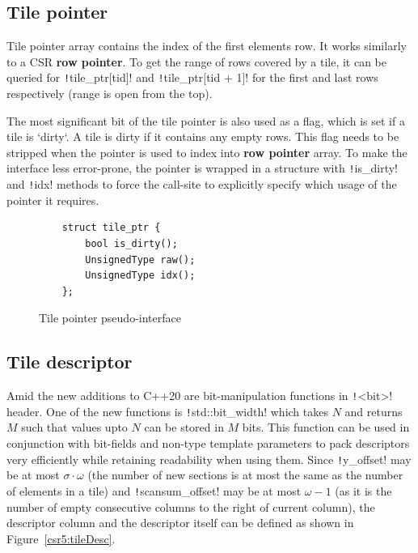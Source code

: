 \documentclass[thesis=M,english]{FITthesis}[2019/12/23]
\newcommand{\csre}[1]{\texttt!#1!}
\begin{document}
\subsection{Tile pointer}

Tile pointer array contains the index of the first elements row. It works similarly to a CSR
\textbf{row pointer}. To get the range of rows covered by a tile, it can be queried for \csre{tile_ptr[tid]}
and \csre{tile_ptr[tid + 1]} for the first and last rows respectively (range is open from the top).

The most significant bit of the tile pointer is also used as a flag, which is set if a tile is `dirty`.
A tile is dirty if it contains any empty rows. This flag needs to be stripped when the pointer is used to
index into \textbf{row pointer} array. To make the interface less error-prone, the pointer is wrapped
in a structure with \csre{is_dirty} and \csre{idx} methods to force the call-site to explicitly specify
which usage of the pointer it requires.

\begin{figure}[htp]
    \begin{verbatim}
    struct tile_ptr {
        bool is_dirty();
        UnsignedType raw(); 
        UnsignedType idx(); 
    };
    \end{verbatim}
    \caption{Tile pointer pseudo-interface}
\end{figure}



\subsection{Tile descriptor}

Amid the new additions to C++20 are bit-manipulation functions in \csre{<bit>} header.
One of the new functions is \csre{std::bit_width} which takes \(N\) and returns \(M\) such that values
upto \(N\) can be stored in \(M\) bits. This function can be used in conjunction with bit-fields
and non-type template parameters to pack descriptors very efficiently while retaining readability when using
them. Since \csre{y_offset} may be at most \(\sigma \cdot \omega\) (the number of new sections is at most the same
as the number of elements in a tile) and \csre{scansum_offset} may be at most \(\omega - 1\) (as it is the number
of empty consecutive columns to the right of current column), the descriptor column and the descriptor
itself can be defined as shown in Figure~\ref{csr5:tileDesc}.
\end{document}
